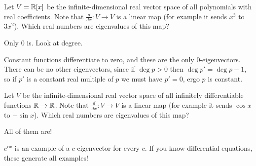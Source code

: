 \begin{problem}
	Let $V = \mathbb R[x]$ be the infinite-dimensional real vector space of
	all polynomials with real coefficients.
	Note that $\frac{d}{dx} \colon V \to V$ is a linear map
	(for example it sends $x^3$ to $3x^2$).
	Which real numbers are eigenvalues of this map?
	\begin{hint}
		Only $0$ is.
		Look at degree.
	\end{hint}
	\begin{sol}
		Constant functions differentiate to zero,
		and these are the only $0$-eigenvectors.
		There can be no other eigenvectors,
		since if $\deg p > 0$ then $\deg p' = \deg p - 1$,
		so if $p'$ is a constant real multiple of $p$
		we must have $p' = 0$, ergo $p$ is constant.
	\end{sol}
\end{problem}

\begin{problem}
	Let $V$ be the infinite-dimensional real vector space of all
	infinitely differentiable functions $\mathbb R \to \mathbb R$.
	Note that $\frac{d}{dx} \colon V \to V$ is a linear map
	(for example it sends $\cos x$ to $-\sin x$).
	Which real numbers are eigenvalues of this map?
	\begin{hint}
		All of them are!
	\end{hint}
	\begin{sol}
		$e^{cx}$ is an example of a $c$-eigenvector for every $c$.
		If you know differential equations,
		these generate all examples!
	\end{sol}
\end{problem}
